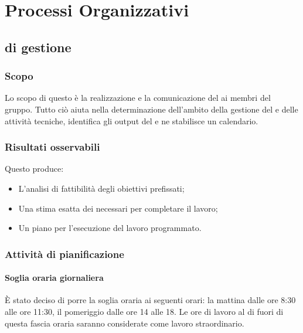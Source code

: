 \section{Processi Organizzativi}


\subsection{ di gestione}

\subsubsection{Scopo}

Lo scopo di questo  è la realizzazione e la comunicazione del \PianoDiProgetto ai membri del gruppo. Tutto ciò aiuta nella determinazione dell'ambito della gestione del  e delle attività tecniche, identifica gli output del  e ne stabilisce un calendario.

\subsubsection{Risultati osservabili}

Questo  produce:
\begin{itemize}

\item L'analisi di fattibilità degli obiettivi prefissati;
\item Una stima esatta dei  necessari per completare il lavoro;
\item Un piano per l'esecuzione del lavoro programmato.

\end{itemize}

\subsubsection{Attività di pianificazione}

\paragraph*{Soglia oraria giornaliera} È stato deciso di porre la soglia oraria ai seguenti orari: la mattina dalle ore 8:30 alle ore 11:30, il pomeriggio dalle ore 14 alle 18. Le ore di lavoro al di fuori di questa fascia oraria saranno considerate come lavoro straordinario.

